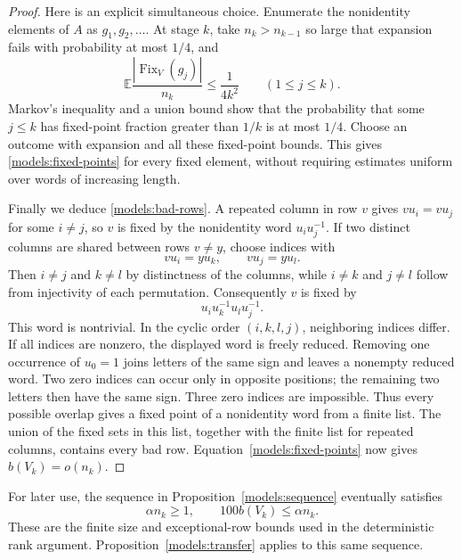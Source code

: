 \begin{proof}
Here is an explicit simultaneous choice. Enumerate the nonidentity
elements of $A$ as $g_1,g_2,\ldots$. At stage $k$, take $n_k>n_{k-1}$
so large that expansion fails with probability at most $1/4$, and
\[
 \mathbb E\frac{|\operatorname{Fix}_{V}(g_j)|}{n_k}
       \le\frac1{4k^2}\qquad(1\le j\le k).
\]
Markov's inequality and a union bound show that the probability that
some $j\le k$ has fixed-point fraction greater than $1/k$ is at most
$1/4$. Choose an outcome with expansion and all these fixed-point
bounds. This gives \eqref{models:fixed-points} for every fixed element,
without requiring estimates uniform over words of increasing length.

Finally we deduce \eqref{models:bad-rows}. A repeated column in row
$v$ gives $vu_i=vu_j$ for some $i\ne j$, so $v$ is fixed by the
nonidentity word $u_i u_j^{-1}$. If two distinct columns are shared
between rows $v\ne y$, choose indices with
\[
 vu_i=yu_k,\qquad vu_j=yu_l.
\]
Then $i\ne j$ and $k\ne l$ by distinctness of the columns, while
$i\ne k$ and $j\ne l$ follow from injectivity of each permutation.
Consequently $v$ is fixed by
\[
 u_i u_k^{-1}u_lu_j^{-1}.
\]
This word is nontrivial. In the cyclic order $(i,k,l,j)$, neighboring
indices differ. If all indices are nonzero, the displayed word is
freely reduced. Removing one occurrence of $u_0=1$ joins letters of
the same sign and leaves a nonempty reduced word. Two zero indices
can occur only in opposite positions; the remaining two letters then
have the same sign. Three zero indices are impossible. Thus every
possible overlap gives a fixed point of a nonidentity word from a
finite list. The union of the fixed sets in this list, together with
the finite list for repeated columns, contains every bad row.
Equation~\eqref{models:fixed-points} now gives $b(V_k)=o(n_k)$.
\end{proof}

For later use, the sequence in Proposition~\ref{models:sequence}
eventually satisfies
\[
 \alpha n_k\ge1,\qquad 100b(V_k)\le\alpha n_k.
\]
These are the finite size and exceptional-row bounds used in the
deterministic rank argument. Proposition~\ref{models:transfer} applies
to this same sequence.
